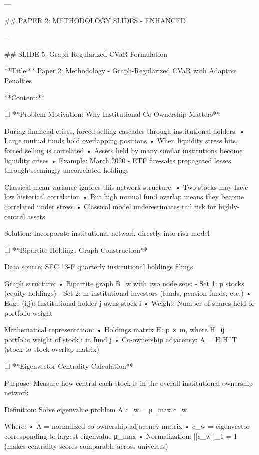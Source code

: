 ---

## PAPER 2: METHODOLOGY SLIDES - ENHANCED

---

## SLIDE 5: Graph-Regularized CVaR Formulation

**Title:** Paper 2: Methodology - Graph-Regularized CVaR with Adaptive Penalties

**Content:**

❑ **Problem Motivation: Why Institutional Co-Ownership Matters**

During financial crises, forced selling cascades through institutional holders:
   • Large mutual funds hold overlapping positions
   • When liquidity stress hits, forced selling is correlated
   • Assets held by many similar institutions become liquidity crises
   • Example: March 2020 - ETF fire-sales propagated losses through seemingly uncorrelated holdings

Classical mean-variance ignores this network structure:
   • Two stocks may have low historical correlation
   • But high mutual fund overlap means they become correlated under stress
   • Classical model underestimates tail risk for highly-central assets

Solution: Incorporate institutional network directly into risk model

❑ **Bipartite Holdings Graph Construction**

Data source: SEC 13-F quarterly institutional holdings filings

Graph structure:
   • Bipartite graph B_w with two node sets:
     - Set 1: p stocks (equity holdings)
     - Set 2: m institutional investors (funds, pension funds, etc.)
   • Edge (i,j): Institutional holder j owns stock i
   • Weight: Number of shares held or portfolio weight

Mathematical representation:
   • Holdings matrix H: p × m, where H_{ij} = portfolio weight of stock i in fund j
   • Co-ownership adjacency: A = H H^T (stock-to-stock overlap matrix)

❑ **Eigenvector Centrality Calculation**

Purpose: Measure how central each stock is in the overall institutional ownership network

Definition: Solve eigenvalue problem
   A c_w = μ_{max} c_w

Where:
   • A = normalized co-ownership adjacency matrix
   • c_w = eigenvector corresponding to largest eigenvalue μ_{max}
   • Normalization: ||c_w||_1 = 1 (makes centrality scores comparable across universes)

